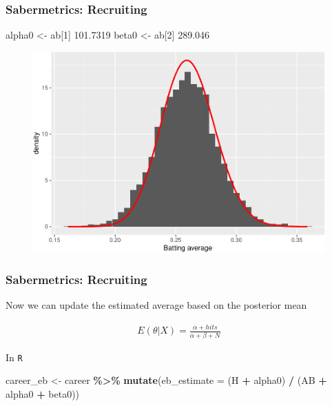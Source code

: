 \documentclass[
  shownotes,
  xcolor={svgnames},
  hyperref={colorlinks,citecolor=DarkBlue,linkcolor=DarkRed,urlcolor=DarkBlue}
  ]{beamer}
\newenvironment{Shaded}{\begin{snugshade}}{\end{snugshade}}
\newcommand{\DataTypeTok}[1]{\textcolor[rgb]{0.13,0.29,0.53}{#1}}
\newcommand{\DecValTok}[1]{\textcolor[rgb]{0.00,0.00,0.81}{#1}}
\newcommand{\KeywordTok}[1]{\textcolor[rgb]{0.13,0.29,0.53}{\textbf{#1}}}
\newcommand{\NormalTok}[1]{#1}
\newcommand{\OperatorTok}[1]{\textcolor[rgb]{0.81,0.36,0.00}{\textbf{#1}}}
\newcommand{\StringTok}[1]{\textcolor[rgb]{0.31,0.60,0.02}{#1}}
\begin{document}
\begin{frame}[fragile]
\frametitle{Sabermetrics: Recruiting}

\begin{Shaded}
\begin{Highlighting}[]
\NormalTok{alpha0 \textless{}{-}}\StringTok{ }\NormalTok{ab[}\DecValTok{1}\NormalTok{]}
101.7319 
\NormalTok{beta0 \textless{}{-}}\StringTok{ }\NormalTok{ab[}\DecValTok{2}\NormalTok{]}
289.046 
\end{Highlighting}
\end{Shaded}



\begin{figure}[H] \centering
  \centering
  \includegraphics[scale=0.4]{figures/av_hist_w_mle.pdf}
  \\
  \tiny 
\end{figure}


\end{frame}
\begin{frame}[fragile]
\frametitle{Sabermetrics: Recruiting}

Now we can update the estimated average based on the posterior mean

\begin{align}
E(\theta|X)=\frac{\alpha+hits}{\alpha+\beta+N}
\end{align}

\bigskip

In \texttt{R}
\begin{Shaded}
\begin{Highlighting}[]
\NormalTok{career\_eb \textless{}{-}}\StringTok{ }\NormalTok{career }\OperatorTok{\%\textgreater{}\%}
\StringTok{    }\KeywordTok{mutate}\NormalTok{(}\DataTypeTok{eb\_estimate =}\NormalTok{ (H }\OperatorTok{+}\StringTok{ }\NormalTok{alpha0) }\OperatorTok{/}\StringTok{ }\NormalTok{(AB }\OperatorTok{+}\StringTok{ }\NormalTok{alpha0 }\OperatorTok{+}\StringTok{ }\NormalTok{beta0))}
\end{Highlighting}
\end{Shaded}

\end{frame}
\end{document}
